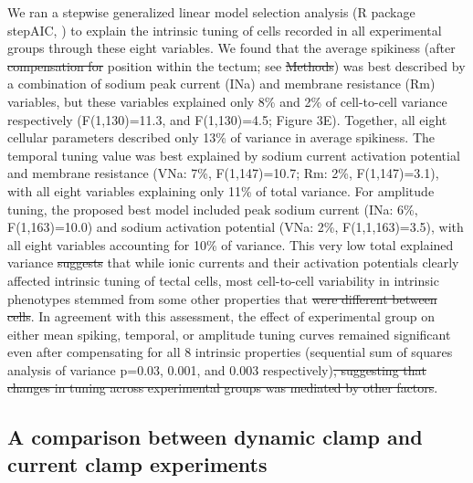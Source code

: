 \documentclass{article}
\providecommand{\DIFaddtex}[1]{{\protect\color{blue}{#1}}} %
\providecommand{\DIFdeltex}[1]{{\protect\color{red}\sout{#1}}}                      %
\providecommand{\DIFaddbegin}{} %
\providecommand{\DIFaddend}{} %
\providecommand{\DIFdelbegin}{} %
\providecommand{\DIFdelend}{} %
\providecommand{\DIFadd}[1]{\texorpdfstring{\DIFaddtex{#1}}{#1}} %
\providecommand{\DIFdel}[1]{\texorpdfstring{\DIFdeltex{#1}}{}} %
\newcommand{\DIFscaledelfig}{0.5}
\newlength{\DIFdelgraphicswidth} %
\newlength{\DIFdelgraphicsheight} %
\newcommand{\DIFaddincludegraphics}[2][]{{\color{blue}\fbox{\DIFOincludegraphics[#1]{#2}}}} %
\newcommand{\DIFdelincludegraphics}[2][]{%
\sbox{\DIFdelgraphicsbox}{\DIFOincludegraphics[#1]{#2}}%
\settoboxwidth{\DIFdelgraphicswidth}{\DIFdelgraphicsbox} %
\settoboxtotalheight{\DIFdelgraphicsheight}{\DIFdelgraphicsbox} %
\scalebox{\DIFscaledelfig}{%
\parbox[b]{\DIFdelgraphicswidth}{\usebox{\DIFdelgraphicsbox}\\[-\baselineskip] \rule{\DIFdelgraphicswidth}{0em}}\llap{\resizebox{\DIFdelgraphicswidth}{\DIFdelgraphicsheight}{%
\setlength{\unitlength}{\DIFdelgraphicswidth}%
\begin{picture}(1,1)%
\thicklines\linethickness{2pt} %
{\color[rgb]{1,0,0}\put(0,0){\framebox(1,1){}}}%
{\color[rgb]{1,0,0}\put(0,0){\line( 1,1){1}}}%
{\color[rgb]{1,0,0}\put(0,1){\line(1,-1){1}}}%
\end{picture}%
}\hspace*{3pt}}} %
} %
\DeclareRobustCommand{\DIFaddbegin}{\DIFOaddbegin \let\includegraphics\DIFaddincludegraphics} %
\DeclareRobustCommand{\DIFaddend}{\DIFOaddend \let\includegraphics\DIFOincludegraphics} %
\DeclareRobustCommand{\DIFdelbegin}{\DIFOdelbegin \let\includegraphics\DIFdelincludegraphics} %
\DeclareRobustCommand{\DIFdelend}{\DIFOaddend \let\includegraphics\DIFOincludegraphics} %
\begin{document}
We ran a stepwise generalized linear model selection analysis (R package stepAIC, \citealt{venables2013}) to explain the intrinsic tuning of cells recorded in all experimental groups through these eight variables. We found that the average spikiness (after \DIFdelbegin \DIFdel{compensation for }\DIFdelend \DIFaddbegin \DIFadd{adjustment for cell }\DIFaddend position within the tectum; see \DIFdelbegin \DIFdel{Methods}\DIFdelend \DIFaddbegin \DIFadd{below}\DIFaddend ) was best described by a combination of sodium peak current (INa) and membrane resistance (Rm) variables, but these variables explained only 8\% and 2\% of cell-to-cell variance respectively (F(1,130)=11.3, and F(1,130)=4.5; Figure 3E). Together, all eight cellular parameters described only 13\% of variance in average spikiness. The temporal tuning value was best explained by sodium current activation potential and membrane resistance (VNa: 7\%, F(1,147)=10.7; Rm: 2\%, F(1,147)=3.1), with all eight variables explaining only 11\% of total variance. For amplitude tuning, the proposed best model included peak sodium current (INa: 6\%, F(1,163)=10.0) and sodium activation potential (VNa: 2\%, F(1,1,163)=3.5), with all eight variables accounting for 10\% of variance. This very low total explained variance \DIFdelbegin \DIFdel{suggests }\DIFdelend \DIFaddbegin \DIFadd{indicates }\DIFaddend that while ionic currents and their activation potentials clearly affected intrinsic tuning of tectal cells, most cell-to-cell variability in intrinsic phenotypes stemmed from some other properties that \DIFdelbegin \DIFdel{were different between cells}\DIFdelend \DIFaddbegin \DIFadd{we did not measure in voltage-clamp experiments}\DIFaddend . In agreement with this assessment, the effect of experimental group on either mean spiking, temporal, or amplitude tuning curves remained significant even after compensating for all 8 intrinsic properties (sequential sum of squares analysis of variance p=0.03, 0.001, and 0.003 respectively)\DIFdelbegin \DIFdel{, suggesting that changes in tuning across experimental groups was mediated by other factors}\DIFdelend .

\subsection*{A comparison between dynamic clamp and current clamp experiments}
\end{document}
